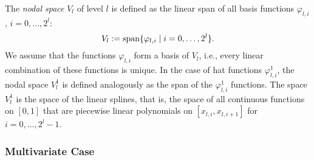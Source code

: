 %
%
The \emph{nodal space} $V_l$ of level $l$
is defined as the linear span of all basis functions
$\varphi_{l,i}$, $i = 0, \dotsc, 2^l$:
\begin{equation}
  V_l := \operatorname{span}\{\varphi_{l,i} \mid i = 0, \dotsc, 2^l\}.
\end{equation}
We assume that the functions $\varphi_{l,i}$ form a basis of $V_l$, i.e.,
every linear combination of these functions is unique.
%
In the case of hat functions $\varphi_{l,i}^1$,
the nodal space $V_l^1$ is defined analogously as the span of the
$\varphi_{l,i}^1$ functions.
The space $V_l^1$ is the space of the linear splines,
that is, the space of all continuous functions on $[0, 1]$ that are
piecewise linear polynomials on $[x_{l,i}, x_{l,i+1}]$ for
$i = 0, \dotsc, 2^l - 1$.

\subsubsection{Multivariate Case}

